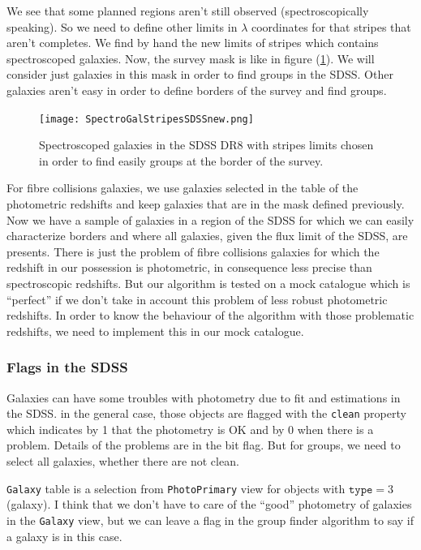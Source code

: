 We see that some planned regions aren't still observed (spectroscopically
speaking). So we need to define other limits in $\lambda$ coordinates for that
stripes that aren't completes. We find by hand the new limits of stripes which
contains spectroscoped galaxies. Now, the survey mask is like in figure
(\ref{fig:SDSSspecgalstripesnew}). We will consider just galaxies in this mask
in order to find groups in the SDSS\@. Other galaxies aren't easy in order to
define borders of the survey and find groups.
\begin{figure}[ht]
    \centering
    \texttt{[image: SpectroGalStripesSDSSnew.png]}
    \caption{Spectroscoped galaxies in the SDSS DR8 with stripes
    limits chosen in order to find easily groups at the border of the survey.}
\label{fig:SDSSspecgalstripesnew}
\end{figure}

For fibre collisions galaxies, we use galaxies selected in the table of the
photometric redshifts and keep galaxies that are in the mask defined
previously. Now we have a sample of galaxies in a region of the SDSS for which
we can easily characterize borders and where all galaxies, given the flux limit
of the SDSS, are presents. There is just the problem of fibre collisions
galaxies for which the redshift in our possession is photometric, in
consequence less precise than spectroscopic redshifts. But our algorithm is
tested on a mock catalogue which is ``perfect'' if we don't take in account
this problem of less robust photometric redshifts. In order to know the
behaviour of the algorithm with those problematic redshifts, we need to
implement this in our mock catalogue.
%
\subsubsection{Flags in the SDSS}
%
Galaxies can have some troubles with photometry due to fit and estimations in
the SDSS\@. in the general case, those objects are flagged with the
\texttt{clean} property which indicates by 1 that the photometry is OK
and by 0 when there is a problem. Details of the problems are in the bit
flag. But for groups, we need to select all galaxies, whether there are not
clean.

\texttt{Galaxy} table is a selection from \texttt{PhotoPrimary} view for
objects with $\mathrm{\texttt{type}}=3$ (galaxy). I think that we don't have to
care of the ``good'' photometry of galaxies in the \texttt{Galaxy} view, but we
can leave a flag in the group finder algorithm to say if a galaxy is in this
case.

